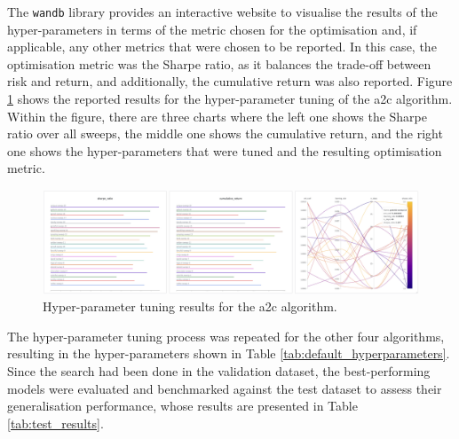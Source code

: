The \texttt{wandb} library provides an interactive website to visualise the results of the hyper-parameters in terms of the metric chosen for the optimisation and, if applicable, any other metrics that were chosen to be reported. In this case, the optimisation metric was the Sharpe ratio, as it balances the trade-off between risk and return, and additionally, the cumulative return was also reported. Figure \ref{fig:a2c_hyperparameter_tuning} shows the reported results for the hyper-parameter tuning of the \acrshort{a2c} algorithm. Within the figure, there are three charts where the left one shows the Sharpe ratio over all sweeps, the middle one shows the cumulative return, and the right one shows the hyper-parameters that were tuned and the resulting optimisation metric.

\begin{figure}[h]
\centering
\includegraphics[width=\textwidth]{figures/a2c_hyperparameter_tuning.png}
\caption{Hyper-parameter tuning results for the \acrshort{a2c} algorithm. }
\label{fig:a2c_hyperparameter_tuning}
\end{figure}

The hyper-parameter tuning process was repeated for the other four algorithms, resulting in the hyper-parameters shown in Table \ref{tab:default_hyperparameters}. Since the search had been done in the validation dataset, the best-performing models were evaluated and benchmarked against the test dataset to assess their generalisation performance, whose results are presented in Table \ref{tab:test_results}.

